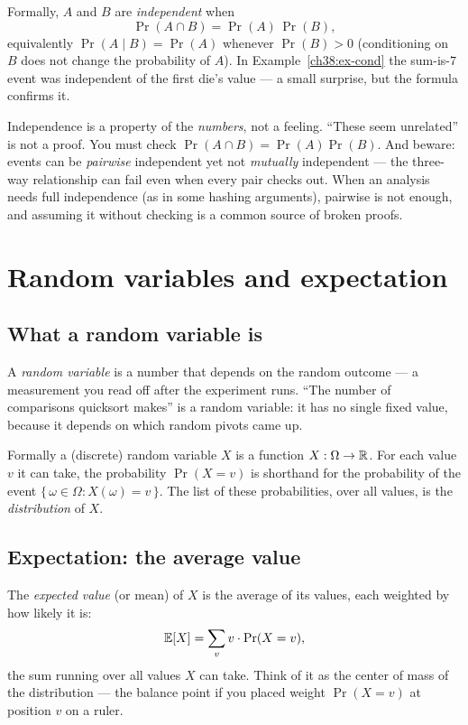 Formally, $A$ and $B$ are \emph{independent} when
\[
\Pr(A \cap B) = \Pr(A)\,\Pr(B),
\]
equivalently $\Pr(A \mid B) = \Pr(A)$ whenever $\Pr(B) > 0$ (conditioning on $B$
does not change the probability of $A$). In Example~\ref{ch38:ex-cond} the sum-is-$7$ event was independent of the
first die's value --- a small surprise, but the formula confirms it.

\begin{trapbox}
Independence is a property of the \emph{numbers}, not a feeling. ``These seem
unrelated'' is not a proof. You must check $\Pr(A \cap B) = \Pr(A)\Pr(B)$. And beware:
events can be \emph{pairwise} independent yet not \emph{mutually} independent --- the
three-way relationship can fail even when every pair checks out. When an analysis
needs full independence (as in some hashing arguments), pairwise is not enough, and
assuming it without checking is a common source of broken proofs.
\end{trapbox}

\section{Random variables and expectation}
\label{ch38:rv}

\subsection{What a random variable is}

\begin{intuitionbox}
A \emph{random variable} is a number that depends on the random outcome --- a
measurement you read off after the experiment runs. ``The number of comparisons
quicksort makes'' is a random variable: it has no single fixed value, because it
depends on which random pivots came up.
\end{intuitionbox}

Formally a (discrete) random variable $X$ is a function $X : \Omega \to \mathbb{R}$. For each
value $v$ it can take, the probability $\Pr(X = v)$ is shorthand for the probability of
the event $\{\, \omega \in \Omega : X(\omega) = v \,\}$. The list of these
probabilities, over all values, is the \emph{distribution} of $X$.

\subsection{Expectation: the average value}

The \emph{expected value} (or mean) of $X$ is the average of its values, each weighted
by how likely it is:
\[
\mathbb{E}[X] = \sum_{v} v \cdot \Pr(X = v),
\]
the sum running over all values $X$ can take. Think of it as the center of mass of the
distribution --- the balance point if you placed weight $\Pr(X=v)$ at position $v$ on a
ruler.

